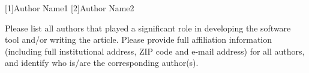[1]{Author Name1}
[2]{Author Name2}


Please list all authors that played a significant role in developing the software tool and/or writing the article. Please provide full affiliation information (including full institutional address, ZIP code and e-mail address) for all authors, and identify who is/are the corresponding author(s).

